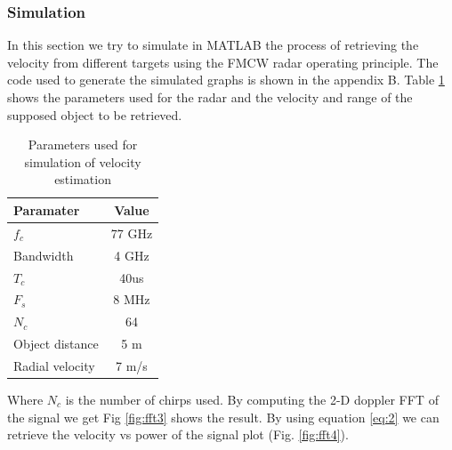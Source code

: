 \subsubsection*{Simulation}
In this section we try to simulate in MATLAB the process of retrieving the velocity from different targets using the \ac{FMCW} \ac{radar} operating principle. The code used to generate the simulated graphs is shown in the appendix B. Table \ref{tab:table2} shows the parameters used for the radar and the velocity and range of the supposed object to be retrieved.
\begin{table}[h!]
  \begin{center}
    \caption{Parameters used for simulation of velocity estimation}
    \label{tab:table2}
    \begin{tabular}{l|c} %
      \textbf{Paramater} & \textbf{Value } \\
      \hline
      $f_c$ & 77 GHz \\
      Bandwidth & 4 GHz \\
      $T_c$ & 40us \\
      $F_s$ & 8 MHz \\
      $N_c$ & 64 \\
      Object distance & 5  m \\
      Radial velocity & 7  m/s
    \end{tabular}
  \end{center}
\end{table}
Where $N_c$ is the number of chirps used. By computing the 2-D doppler \ac{FFT} of the signal we get  Fig \ref{fig:fft3} shows the result. By using equation \ref{eq:2} we can retrieve the velocity vs power of the signal plot (Fig. \ref{fig:fft4}). 
